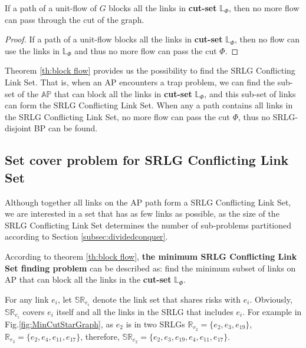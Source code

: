 \begin{theorem}
    If a path of a unit-flow of $G$ blocks all the links in \textbf{cut-set} $\mathbb{L}_{\Phi}$, then no more flow can pass through the cut of the graph.
\label{th:block flow}
\end{theorem}

\begin{proof}
    If a path of a unit-flow blocks all the links in \textbf{cut-set} $\mathbb{L}_{\Phi}$, then no flow can use the links in  $\mathbb{L}_{\Phi}$ and thus no more flow can pass the cut $\Phi$.
\end{proof}

Theorem \ref{th:block flow} provides us the possibility to find the SRLG Conflicting Link Set. That is, when an AP encounters a trap problem, we can find the sub-set of the $\mathbb{AP}$  that can block all the links in \textbf{cut-set} $\mathbb{L}_{\Phi}$, and this sub-set of links can form the  SRLG Conflicting Link Set. When any a path contains all links in the SRLG Conflicting Link Set, no more flow can pass the cut $\Phi$, thus no SRLG-disjoint BP can be found.


\subsection{Set cover problem for SRLG Conflicting Link Set}
\label{subsec:Set cover problem for SRLG Conflicting Link Set}
Although together all links on the AP path form a SRLG Conflicting Link Set, we are interested in a set that has as few links as possible, as the size of the SRLG Conflicting Link Set determines the number of sub-problems partitioned according to Section \ref{subsec:dividedconquer}.





According to theorem \ref{th:block flow}, \textbf{the minimum SRLG Conflicting Link Set finding problem} can be described as:  find the minimum subset of links on AP  that can block all the  links in the \textbf{cut-set} $\mathbb{L}_{\Phi}$.

For any link $e_i$, let $\mathbb{SR}_{e_i}$ denote the link set that shares risks with $e_i$. Obviously, $\mathbb{SR}_{e_i}$ covers $e_i$ itself and all the links in the SRLG that includes $e_i$. For example in Fig.\ref{fig:MinCutStarGraph}, as $e_2$ is in two SRLGs $\mathbb{R}_{r_2}=\{e_2,e_3,e_{19}\}$, $\mathbb{R}_{r_3}=\{e_2,e_4,e_{11},e_{17}\}$, therefore, $\mathbb{SR}_{e_2}=\{e_2,e_3,e_{19},e_4,e_{11},e_{17}\}$.

